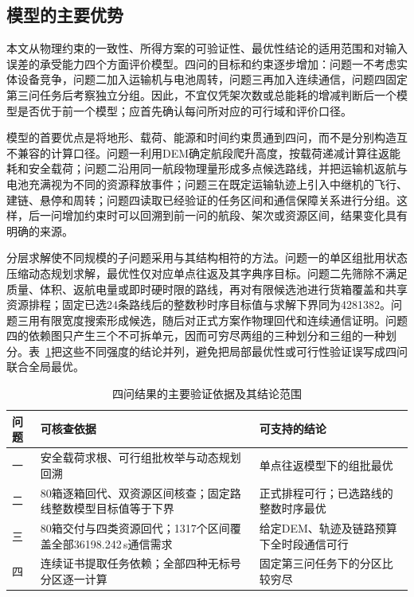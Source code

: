 \documentclass[bwprint,fontset=fandol]{gmcmthesis}
\begin{document}
\subsection{模型的主要优势}
本文从物理约束的一致性、所得方案的可验证性、最优性结论的适用范围和对输入误差的承受能力四个方面评价模型。四问的目标和约束逐步增加：问题一不考虑实体设备竞争，问题二加入运输机与电池周转，问题三再加入连续通信，问题四固定第三问任务后考察独立分组。因此，不宜仅凭架次数或总能耗的增减判断后一个模型是否优于前一个模型；应首先确认每问所对应的可行域和评价口径。

模型的首要优点是将地形、载荷、能源和时间约束贯通到四问，而不是分别构造互不兼容的计算口径。问题一利用DEM确定航段爬升高度，按载荷递减计算往返能耗和安全载荷；问题二沿用同一航段物理量形成多点候选路线，并把运输机返航与电池充满视为不同的资源释放事件；问题三在既定运输轨迹上引入中继机的飞行、建链、悬停和周转；问题四读取已经验证的任务区间和通信保障关系进行分组。这样，后一问增加约束时可以回溯到前一问的航段、架次或资源区间，结果变化具有明确的来源。

分层求解使不同规模的子问题采用与其结构相符的方法。问题一的单区组批用状态压缩动态规划求解，最优性仅对应单点往返及其字典序目标。问题二先筛除不满足质量、体积、返航电量或即时硬时限的路线，再对有限候选池进行货箱覆盖和共享资源排程；固定已选24条路线后的整数秒时序目标值与求解下界同为4281382。问题三用有限宽度搜索形成候选，随后对正式方案作物理回代和连续通信证明。问题四的依赖图只产生三个不可拆单元，因而可穷尽两组的三种划分和三组的一种划分。表~\ref{tab:model-eval-scope}把这些不同强度的结论并列，避免把局部最优性或可行性验证误写成四问联合全局最优。

\begin{table}[htbp]
\centering\small
\caption{四问结果的主要验证依据及其结论范围}
\label{tab:model-eval-scope}
\begin{tabular}{@{}p{}p{}p{}@{}}
\toprule
问题 & 可核查依据 & 可支持的结论\\
\midrule
一 & 安全载荷求根、可行组批枚举与动态规划回溯 & 单点往返模型下的组批最优\\
二 & 80箱逐箱回代、双资源区间核查；固定路线整数模型目标值等于下界 & 正式排程可行；已选路线的整数时序最优\\
三 & 80箱交付与四类资源回代；1317个区间覆盖全部36198.242\,s通信需求 & 给定DEM、轨迹及链路预算下全时段通信可行\\
四 & 连续证书提取任务依赖；全部四种无标号分区逐一计算 & 固定第三问任务下的分区比较穷尽\\
\bottomrule
\end{tabular}
\end{table}
\end{document}

